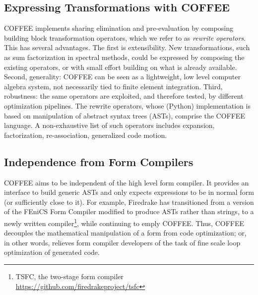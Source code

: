 \subsection{Expressing Transformations with COFFEE}
COFFEE implements sharing elimination and pre-evaluation by composing building block transformation operators, which we refer to as \emph{rewrite operators}. This has several advantages. The first is extensibility. New transformations, such as sum factorization in spectral methods, could be expressed by composing the existing operators, or with small effort building on what is already available. Second, generality: COFFEE can be seen as a lightweight, low level computer algebra system, not necessarily tied to finite element integration. Third, robustness: the same operators are exploited, and therefore tested, by different optimization pipelines. The rewrite operators, whose (Python) implementation is based on manipulation of abstract syntax trees (ASTs), comprise the COFFEE language. A non-exhaustive list of such operators includes expansion, factorization, re-association, generalized code motion.

\subsection{Independence from Form Compilers}
COFFEE aims to be independent of the high level form compiler. It provides an interface to build generic ASTs and only expects expressions to be in normal form (or sufficiently close to it). For example, Firedrake has transitioned from a version of the FEniCS Form Compiler \cite{FFC-TC} modified to produce ASTs rather than strings, to a newly written compiler\footnote{TSFC, the two-stage form compiler \url{https://github.com/firedrakeproject/tsfc}}, while continuing to emply COFFEE. Thus, COFFEE decouples the mathematical manipulation of a form from code optimization; or, in other words, relieves form compiler developers of the task of fine scale loop optimization of generated code.

